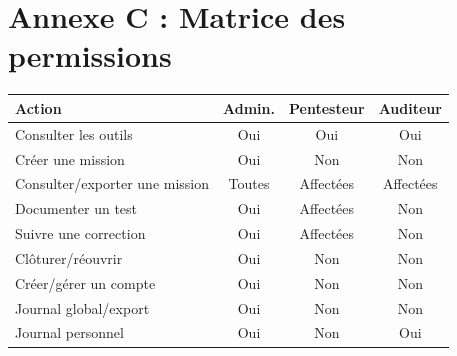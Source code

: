\section*{Annexe C : Matrice des permissions}
\begin{table}[H]
\centering\small
\begin{tabularx}{\textwidth}{X c c c}
\toprule
\rowcolor{AuditLight}Action & Admin. & Pentesteur & Auditeur\\
\midrule
Consulter les outils & Oui & Oui & Oui\\
Cr\'eer une mission & Oui & Non & Non\\
Consulter/exporter une mission & Toutes & Affect\'ees & Affect\'ees\\
Documenter un test & Oui & Affect\'ees & Non\\
Suivre une correction & Oui & Affect\'ees & Non\\
Cl\^oturer/r\'eouvrir & Oui & Non & Non\\
Cr\'eer/g\'erer un compte & Oui & Non & Non\\
Journal global/export & Oui & Non & Non\\
Journal personnel & Oui & Non & Oui\\
\bottomrule
\end{tabularx}
\end{table}

